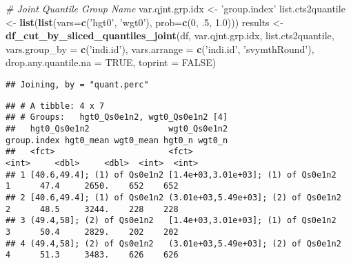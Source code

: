 \documentclass[
]{book}
\newenvironment{Shaded}{\begin{snugshade}}{\end{snugshade}}
\newcommand{\CommentTok}[1]{\textcolor[rgb]{0.56,0.35,0.01}{\textit{#1}}}
\newcommand{\DataTypeTok}[1]{\textcolor[rgb]{0.13,0.29,0.53}{#1}}
\newcommand{\DecValTok}[1]{\textcolor[rgb]{0.00,0.00,0.81}{#1}}
\newcommand{\FloatTok}[1]{\textcolor[rgb]{0.00,0.00,0.81}{#1}}
\newcommand{\KeywordTok}[1]{\textcolor[rgb]{0.13,0.29,0.53}{\textbf{#1}}}
\newcommand{\NormalTok}[1]{#1}
\newcommand{\OperatorTok}[1]{\textcolor[rgb]{0.81,0.36,0.00}{\textbf{#1}}}
\newcommand{\OtherTok}[1]{\textcolor[rgb]{0.56,0.35,0.01}{#1}}
\newcommand{\StringTok}[1]{\textcolor[rgb]{0.31,0.60,0.02}{#1}}
\begin{document}
\begin{Shaded}
\begin{Highlighting}[]
\CommentTok{# Joint Quantile Group Name}
\NormalTok{var.qjnt.grp.idx <-}\StringTok{ 'group.index'}
\NormalTok{list.cts2quantile <-}\StringTok{ }\KeywordTok{list}\NormalTok{(}\KeywordTok{list}\NormalTok{(}\DataTypeTok{vars=}\KeywordTok{c}\NormalTok{(}\StringTok{'hgt0'}\NormalTok{, }\StringTok{'wgt0'}\NormalTok{), }\DataTypeTok{prob=}\KeywordTok{c}\NormalTok{(}\DecValTok{0}\NormalTok{, }\FloatTok{.5}\NormalTok{, }\FloatTok{1.0}\NormalTok{)))}
\NormalTok{results <-}\StringTok{ }\KeywordTok{df_cut_by_sliced_quantiles_joint}\NormalTok{(df, var.qjnt.grp.idx, list.cts2quantile,}
                                            \DataTypeTok{vars.group_by =} \KeywordTok{c}\NormalTok{(}\StringTok{'indi.id'}\NormalTok{), }\DataTypeTok{vars.arrange =} \KeywordTok{c}\NormalTok{(}\StringTok{'indi.id'}\NormalTok{, }\StringTok{'svymthRound'}\NormalTok{),}
                                            \DataTypeTok{drop.any.quantile.na =} \OtherTok{TRUE}\NormalTok{, }\DataTypeTok{toprint =} \OtherTok{FALSE}\NormalTok{)}
\end{Highlighting}
\end{Shaded}

\begin{verbatim}
## Joining, by = "quant.perc"
\end{verbatim}

\begin{Shaded}
\end{Shaded}

\begin{verbatim}
## # A tibble: 4 x 7
## # Groups:   hgt0_Qs0e1n2, wgt0_Qs0e1n2 [4]
##   hgt0_Qs0e1n2                wgt0_Qs0e1n2                        group.index hgt0_mean wgt0_mean hgt0_n wgt0_n
##   <fct>                       <fct>                                     <int>     <dbl>     <dbl>  <int>  <int>
## 1 [40.6,49.4]; (1) of Qs0e1n2 [1.4e+03,3.01e+03]; (1) of Qs0e1n2            1      47.4     2650.    652    652
## 2 [40.6,49.4]; (1) of Qs0e1n2 (3.01e+03,5.49e+03]; (2) of Qs0e1n2           2      48.5     3244.    228    228
## 3 (49.4,58]; (2) of Qs0e1n2   [1.4e+03,3.01e+03]; (1) of Qs0e1n2            3      50.4     2829.    202    202
## 4 (49.4,58]; (2) of Qs0e1n2   (3.01e+03,5.49e+03]; (2) of Qs0e1n2           4      51.3     3483.    626    626
\end{verbatim}
\end{document}
